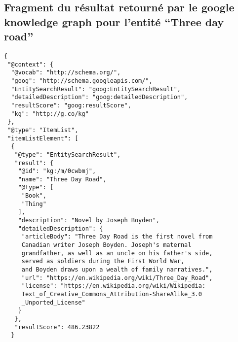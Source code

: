 \begin{appendices}
\subsection{Fragment du résultat retourné par le google knowledge graph pour l'entité \enquote{Three day road}}

\begin{lstlisting}
{
 "@context": {
  "@vocab": "http://schema.org/",
  "goog": "http://schema.googleapis.com/",
  "EntitySearchResult": "goog:EntitySearchResult",
  "detailedDescription": "goog:detailedDescription",
  "resultScore": "goog:resultScore",
  "kg": "http://g.co/kg"
 },
 "@type": "ItemList",
 "itemListElement": [
  {
   "@type": "EntitySearchResult",
   "result": {
    "@id": "kg:/m/0cwbmj",
    "name": "Three Day Road",
    "@type": [
     "Book",
     "Thing"
    ],
    "description": "Novel by Joseph Boyden",
    "detailedDescription": {
     "articleBody": "Three Day Road is the first novel from 
     Canadian writer Joseph Boyden. Joseph's maternal 
     grandfather, as well as an uncle on his father's side, 
     served as soldiers during the First World War, 
     and Boyden draws upon a wealth of family narratives.",
     "url": "https://en.wikipedia.org/wiki/Three_Day_Road",
     "license": "https://en.wikipedia.org/wiki/Wikipedia:
     Text_of_Creative_Commons_Attribution-ShareAlike_3.0
     _Unported_License"
    }
   },
   "resultScore": 486.23822
  }
\end{lstlisting}

\end{appendices}